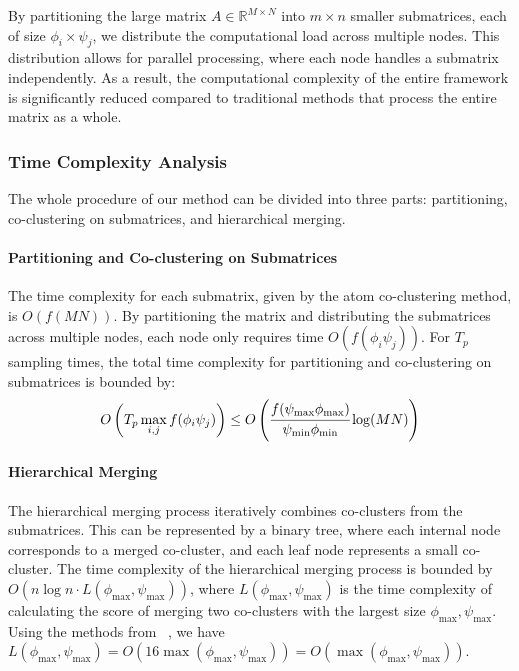 \documentclass[journal]{IEEEtran}
\renewcommand{\cite}[1]{~\autocite{#1}}
\begin{document}
By partitioning the large matrix \(A \in \mathbb{R}^{M \times N}\) into \(m \times n\) smaller submatrices, each of size \(\phi_i \times \psi_j\), we distribute the computational load across multiple nodes. This distribution allows for parallel processing, where each node handles a submatrix independently. As a result, the computational complexity of the entire framework is significantly reduced compared to traditional methods that process the entire matrix as a whole.

\subsubsection{Time Complexity Analysis}
\label{subsubsec:time_complexity}

The whole procedure of our method can be divided into three parts: partitioning, co-clustering on submatrices, and hierarchical merging.

\paragraph{Partitioning and Co-clustering on Submatrices} The time complexity for each submatrix, given by the atom co-clustering method, is \(O(f(MN))\). By partitioning the matrix and distributing the submatrices across multiple nodes, each node only requires time \(O(f(\phi_i\psi_j))\). For $T_p$ sampling times, the total time complexity for partitioning and co-clustering on submatrices is bounded by:
\begin{equation}
  \begin{split}
    O\left(T_p \max_{i,j} f(\phi_i\psi_j)\right) \le O\left( \cfrac{f(\psi_{\text{max}} \phi_{\text{max}})}{\psi_{\text{min}} \phi_{\text{min}}} \log(MN) \right)
    \label{eq:time_complexity_partitioning}
  \end{split}
\end{equation}

\paragraph{Hierarchical Merging} The hierarchical merging process iteratively combines co-clusters from the submatrices. This can be represented by a binary tree, where each internal node corresponds to a merged co-cluster, and each leaf node represents a small co-cluster. The time complexity of the hierarchical merging process is bounded by \(O(n \log n \cdot L(\phi_\text{max}, \psi_\text{max}))\), where \(L(\phi_\text{max}, \psi_\text{max})\) is the time complexity of calculating the score of merging two co-clusters with the largest size \(\phi_\text{max},  \psi_\text{max}\). Using the methods from \cite{lee2014BigDataMatrix}, we have \(L(\phi_\text{max}, \psi_\text{max}) = O(16 \max(\phi_\text{max}, \psi_\text{max})) = O(\max(\phi_\text{max}, \psi_\text{max}))\).
\end{document}
